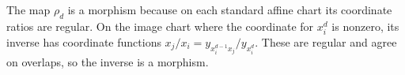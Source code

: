 The map $\rho_d$ is a morphism because on each standard affine chart its coordinate ratios are regular. On the image chart where the coordinate for $x_i^d$ is nonzero, its inverse has coordinate functions $x_j/x_i=y_{x_i^{d-1}x_j}/y_{x_i^d}$. These are regular and agree on overlaps, so the inverse is a morphism.
